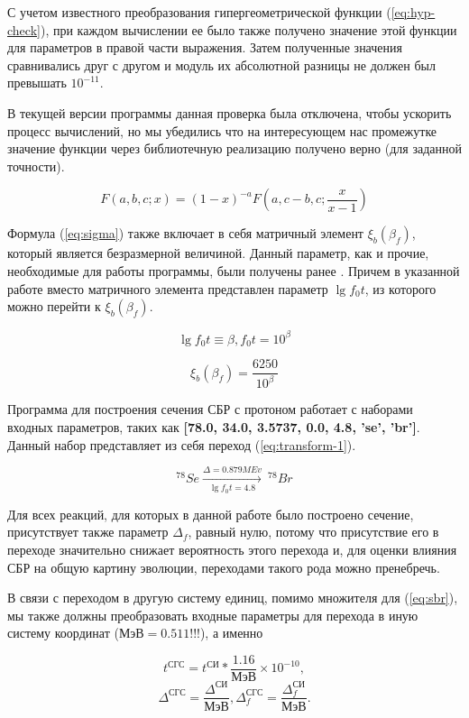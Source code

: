 \documentclass[%
master,    %
natbib,      %
subf,        %
href,        %
colorlinks,  %
]{disser}
\begin{document}
С учетом известного преобразования гипергеометрической функции (\ref{eq:hyp-check}), при каждом вычислении ее было также получено значение этой функции для параметров в правой части выражения. Затем полученные значения сравнивались друг с другом и модуль их абсолютной разницы не должен был превышать $10^{-11}$. 

В текущей версии программы данная проверка была отключена, чтобы ускорить процесс вычислений, но мы убедились что на интересующем нас промежутке значение функции через библиотечную реализацию получено верно (для заданной точности).

\begin{equation}
\label{eq:hyp-check}
F(a,b,c;x) = (1-x)^{-a}F\left(a,c-b,c; \frac{x}{x-1}\right)
\end{equation}

Формула (\ref{eq:sigma}) также включает в себя матричный элемент $\xi_b(\beta_f)$, который является безразмерной величиной. Данный параметр, как и прочие, необходимые для работы программы, были получены ранее \cite{tak}. Причем в указанной работе вместо матричного элемента представлен параметр $\lg f_0 t$, из которого можно перейти к  $\xi_b(\beta_f)$.

$$
\lg f_0 t \equiv \beta, f_0 t = 10^\beta
$$

$$
\xi_b(\beta_f) = \frac{6250}{10^\beta}
$$

Программа для построения сечения СБР с протоном работает с наборами входных параметров, таких как \textbf{[78.0, 34.0, 3.5737, 0.0, 4.8, 'se', 'br']}. Данный набор представляет из себя переход (\ref{eq:transform-1}).

\begin{equation}
\label{eq:transform-1}
^{78}Se \xrightarrow[\lg f_0 t = 4.8]{\Delta = 0.879 MEv}  \ ^{78}Br
\end{equation}

Для всех реакций, для которых в данной работе было построено сечение, присутствует также параметр $\Delta_f$, равный нулю, потому что присутствие его в переходе значительно снижает вероятность этого перехода и, для оценки влияния СБР на общую картину эволюции, переходами такого рода можно пренебречь.

В связи с переходом в другую систему единиц, помимо множителя для (\ref{eq:sbr}),  мы также должны преобразовать входные параметры для перехода в иную систему координат ($\text{МэВ} = 0.511 $!!!), а именно

$$
t^{\text{СГС}} = t^{\text{СИ}} * \frac{1.16}{\text{МэВ}} \times 10^{-10},
$$
$$
\Delta^{\text{СГС}} = \frac{\Delta^{\text{СИ}}}{\text{МэВ}}, \Delta_f^{\text{СГС}} = \frac{\Delta_f^{\text{СИ}}}{\text{МэВ}}.
$$
\end{document}

